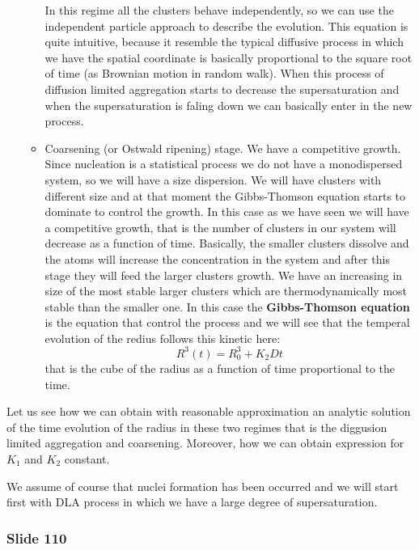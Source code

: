 \documentclass[../main/main.tex]{subfiles}
\begin{document}
\begin{enumerate}
\begin{itemize}
In this regime all the clusters behave independently, so we can use the independent particle approach to describe the evolution.
This equation is quite intuitive, because it resemble the typical diffusive process in which we have the spatial coordinate is basically proportional to the square root of time (as Brownian motion in random walk).
When this process of diffusion limited aggregation starts to decrease the supersaturation and when the supersaturation is faling down we can basically enter in the new process.

\item Coarsening (or Ostwald ripening) stage. We have a competitive growth. Since nucleation is a statistical process we do not have a monodispersed system, so we will have a size dispersion. We will have clusters with different size and at that moment the Gibbs-Thomson equation starts to dominate to control the growth. In this case as we have seen we will have a competitive growth, that is the number of clusters in our system will decrease as a function of time. Basically, the smaller clusters dissolve and the atoms will increase the concentration in the system and after this stage they will feed the larger clusters growth. We have an increasing in size of the most stable larger clusters which are thermodynamically most stable than the smaller one.
In this case the \textbf{Gibbs-Thomson equation} is the equation that control the process and we will see that the temperal evolution of the redius follows this kinetic here:
\begin{equation*}
  R^3(t) = R_0^3 + K_2 D t
\end{equation*}
that is the cube of the radius as a function of time proportional to the time.

\end{itemize}


\end{enumerate}

Let us see how we can obtain with reasonable approximation an analytic solution of the time evolution of the radius in these two regimes that is the diggusion limited aggregation and coarsening. Moreover, how we can obtain expression for \( K_1 \) and \( K_2 \) constant.

We assume of course that nuclei formation has been occurred and we will start first with DLA process in which we have a large degree of supersaturation.

\newpage

\subsubsection{Slide 110}
\end{document}
